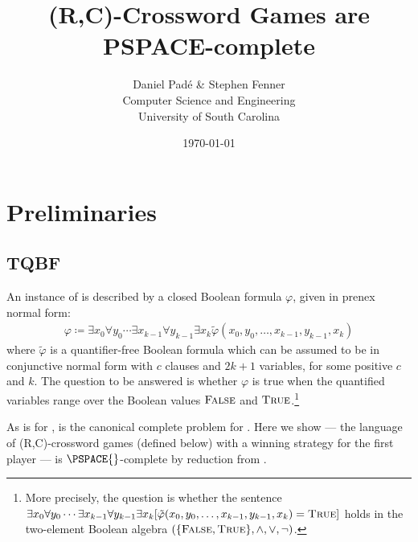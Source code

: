 \documentclass{article}
\title{(R,C)-Crossword Games are PSPACE-complete}
\author{%
    Daniel Pad\'e \& Stephen Fenner \\
    Computer Science and Engineering \\
    University of South Carolina\\
}
\date{\today}
\newcommand{\0}{\mathbf{0}}
\newcommand{\1}{\mathbf{1}}
\newcommand{\2}{\mathbf{2}}
\newcommand{\TQBF}{\lang{TQBF}}
\newcommand{\RCG}{\lang{RCG}}
\newcommand{\myand}{\mathrel{\wedge}}
\newcommand{\myor}{\mathrel{\vee}}
\newcommand{\mynot}{\neg}
\newcommand{\False}{\textsc{False}}
\newcommand{\True}{\textsc{True}}
\theoremstyle{plain}
\theoremstyle{definition}
\newcounter{col}
\begin{document}
\maketitle

\section{Preliminaries}

\subsection{TQBF}

An instance of \TQBF{} is described by a closed Boolean formula $\varphi$,
given in prenex normal form:
\begin{align*}
  \varphi \coloneqq \exists x_0 \forall y_0 \cdots \exists x_{k-1} \forall y_{k-1}\exists x_k
  \tilde{\varphi}(x_0, y_0, \ldots, x_{k-1}, y_{k-1}, x_k)
\end{align*}
where $\tilde{\varphi}$ is a quantifier-free Boolean formula which can be assumed to be in conjunctive normal form with $c$ clauses and $2k+1$ variables, for some positive $c$ and $k$.
The question to be answered is whether $\varphi$ is true when the quantified variables range over the Boolean values $\False$ and $\True$.\footnote{More precisely, the question is whether the sentence $\exists x_0 \forall y_0 \cdots \exists x_{k-1} \forall y_{k-1}\exists x_k
  [\tilde{\varphi}(x_0, y_0, \ldots, x_{k-1}, y_{k-1}, x_k) = \True]$ holds in the two-element Boolean algebra $(\{\False,\True\},\myand,\myor,\mynot)$.}

As  is for ,  is the canonical complete
problem for . Here we show \RCG{} --- the language of
(R,C)-crossword games (defined below) with a winning strategy for the first player --- is $\PSPACE{}$-complete by reduction from \TQBF{}.
\end{document}
